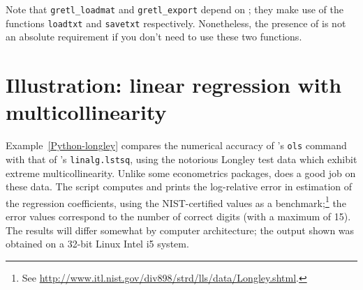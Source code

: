 Note that \verb|gretl_loadmat| and \verb|gretl_export| depend on
; they make use of the functions \texttt{loadtxt} and
\texttt{savetxt} respectively. Nonetheless, the presence of
 is not an absolute requirement if you don't need
to use these two functions.

\section{Illustration: linear regression with multicollinearity}
\label{sec:Python-longley}

Example~\ref{Python-longley} compares the numerical accuracy of
's \texttt{ols} command with that of 's
\texttt{linalg.lstsq}, using the notorious Longley test data which
exhibit extreme multicollinearity.  Unlike some econometrics packages,
 does a good job on these data. The script computes and
prints the log-relative error in estimation of the regression
coefficients, using the NIST-certified values as a
benchmark;\footnote{See
  \url{http://www.itl.nist.gov/div898/strd/lls/data/Longley.shtml}.}
the error values correspond to the number of correct digits (with a
maximum of 15). The results will differ somewhat by computer
architecture; the output shown was obtained on a 32-bit Linux Intel i5
system.

